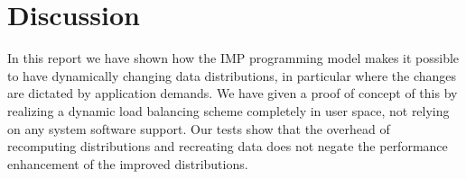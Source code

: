 \documentclass[11pt,fleqn,preprint]{impreport}
\begin{document}
\section{Discussion}

In this report we have shown how the \ac{IMP} programming model makes
it possible to have dynamically changing data distributions, in
particular where the changes are dictated by application demands. We
have given a proof of concept of this by realizing a dynamic load
balancing scheme completely in user space, not relying on any system
software support. Our tests show that the overhead of recomputing
distributions and recreating data does not negate the performance
enhancement of the improved distributions.



\end{document}
